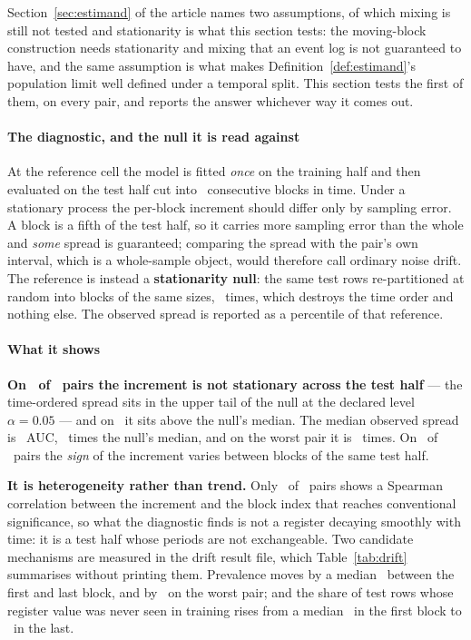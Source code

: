 Section~\ref{sec:estimand} of the article names two assumptions, of which
mixing is still not tested and stationarity is what this section tests: the
moving-block construction needs stationarity and mixing that an event log is
not guaranteed to have, and the same assumption is what makes
Definition~\ref{def:estimand}'s population limit well defined under a temporal
split. This section tests the first of them, on every pair, and reports the
answer whichever way it comes out.

\paragraph{The diagnostic, and the null it is read against}
At the reference cell the model is fitted \emph{once} on the training half and
then evaluated on the test half cut into \nDriftBlocks\ consecutive blocks in
time. Under a stationary process the per-block increment should differ only by
sampling error. A block is a fifth of the test half, so it carries more
sampling error than the whole and \emph{some} spread is guaranteed; comparing
the spread with the pair's own interval, which is a whole-sample object, would
therefore call ordinary noise drift. The reference is instead a
\textbf{stationarity null}: the same test rows re-partitioned at random into
blocks of the same sizes, \nDriftPerm\ times, which destroys the time order
and nothing else. The observed spread is reported as a percentile of that
reference.



\paragraph{What it shows}
\textbf{On \nDrifts\ of \nDriftPairs\ pairs the increment is not stationary
across the test half} --- the time-ordered spread sits in the upper tail of
the null at the declared level $\alpha = 0.05$ --- and on
\nDriftAboveNullMedian\ it sits above the null's median. The median observed spread is \driftSpreadMedian\ AUC,
\driftOverNullMedian\ times the null's median, and on the worst pair it is
\driftOverNullMax\ times. On \nDriftSignVaries\ of \nDriftPairs\ pairs the
\emph{sign} of the increment varies between blocks of the same test half.

\textbf{It is heterogeneity rather than trend.} Only \nDriftTrend\ of
\nDriftPairs\ pairs shows a Spearman correlation between the increment and the
block index that reaches conventional significance, so what the diagnostic
finds is not a register decaying smoothly with time: it is a test half whose
periods are not exchangeable. Two candidate mechanisms are measured in the
drift result file, which Table~\ref{tab:drift} summarises without printing
them. Prevalence moves by a median \driftPrevSpreadMedian\ between the first and
last block, and by \driftPrevSpreadMax\ on the worst pair; and the share of
test rows whose register value was never seen in training rises from a median
\driftUnseenFirstPct\ in the first block to \driftUnseenLastPct\ in the last.

